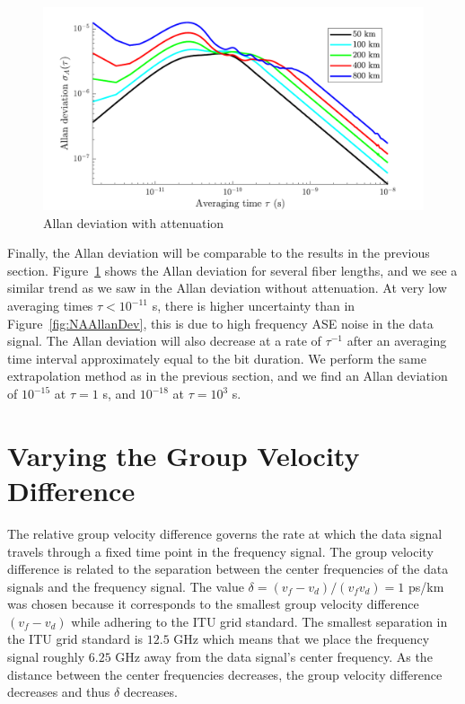 %
\begin{figure}[htb]
	\centering
	\includegraphics[scale=0.9]{img/AAllanDev}
	\caption{Allan deviation with attenuation} \label{fig:AAllanDev}
\end{figure}
% 
Finally, the Allan deviation will be comparable to the results in the previous section. Figure~\ref{fig:AAllanDev} shows the Allan deviation for several fiber lengths, and we see a similar trend as we saw in the Allan deviation without attenuation. At very low averaging times $\tau < 10^{-11}$ s, there is higher uncertainty than in Figure~\ref{fig:NAAllanDev}, this is due to high frequency ASE noise in the data signal. The Allan deviation will also decrease at a rate of $\tau^{-1}$ after an averaging time interval approximately equal to the bit duration. We perform the same extrapolation method as in the previous section, and we find an Allan deviation of $10^{-15}$ at $\tau=1$ s, and $10^{-18}$ at $\tau=10^3$ s.

\section{Varying the Group Velocity Difference}

The relative group velocity difference governs the rate at which the data signal travels through a fixed time point in the frequency signal. The group velocity difference is related to the separation between the center frequencies of the data signals and the frequency signal. The value $\delta = (v_{f}-v_{d})/(v_fv_d) = 1$ ps/km was chosen because it corresponds to the smallest group velocity difference $(v_f-v_d)$ while adhering to the ITU grid standard. The smallest separation in the ITU grid standard is $12.5$ GHz which means that we place the frequency signal roughly $6.25$ GHz away from the data signal's center frequency. As the distance between the center frequencies decreases, the group velocity difference decreases and thus $\delta$ decreases. 


